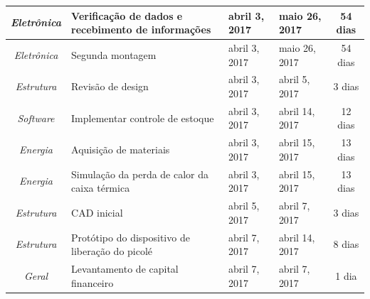 \begin{longtable}{|c|m{6.5cm}|m{3.2cm}|m{3.2cm}|c|}
\textit{Eletrônica}                                                       & Verificação de dados e recebimento de informações    & abril 3, 2017                        & maio 26, 2017                     & 54 dias                               \\ \hline
\textit{Eletrônica}                                                       & Segunda montagem                                     & abril 3, 2017                        & maio 26, 2017                     & 54 dias                               \\ \hline
\textit{Estrutura}                                                        & Revisão de design                                    & abril 3, 2017                        & abril 5, 2017                     & 3 dias                                \\ \hline
\textit{Software}                                                         & Implementar controle de estoque                      & abril 3, 2017                        & abril 14, 2017                    & 12 dias                               \\ \hline
\textit{Energia}                                                          & Aquisição de materiais                               & abril 3, 2017                        & abril 15, 2017                    & 13 dias                               \\ \hline
\textit{Energia}                                                          & Simulação da perda de calor da caixa térmica         & abril 3, 2017                        & abril 15, 2017                    & 13 dias                               \\ \hline
\textit{Estrutura}                                                        & CAD inicial                                          & abril 5, 2017                        & abril 7, 2017                     & 3 dias                                \\ \hline
\textit{Estrutura}                                                        & Protótipo do dispositivo de liberação do picolé      & abril 7, 2017                        & abril 14, 2017                    & 8 dias                                \\ \hline
\textit{Geral}                                                            & Levantamento de capital financeiro                   & abril 7, 2017                        & abril 7, 2017                     & 1 dia                                 \\ \hline

\end{longtable}
